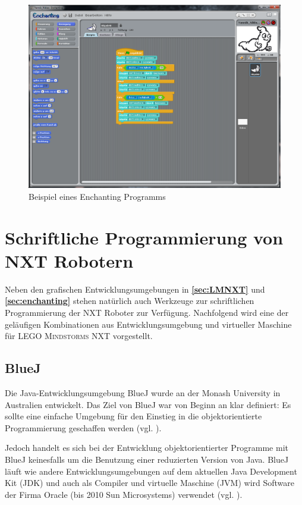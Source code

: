 \documentclass[paper=a4, DIV=calc, BCOR=12mm, twoside=on, onecolumn=on, open = right, titlepage =on, parskip =half-, headsepline = on, footsepline = off, chapterprefix = off, appendixprefix = on, fontsize = 12pt, numbers = noenddot, abstract = on]{scrbook}
\begin{document}
\begin{figure}[htb]
\centering
\includegraphics[width=\textwidth]{images/Beispielprogramm_Enchanting.png} 
\caption{Beispiel eines Enchanting Programms}
\label{fig:Bsp Enchanting}
\end{figure}



\section{Schriftliche Programmierung von NXT Robotern}
\label{sec:bluejetc}
Neben den grafischen Entwicklungsumgebungen in \textbf{\ref{sec:LMNXT}} und \textbf{\ref{sec:enchanting}} stehen natürlich auch Werkzeuge zur schriftlichen Programmierung der NXT Roboter zur Verfügung. Nachfolgend wird eine der geläufigen Kombinationen aus Entwicklungsumgebung und virtueller Maschine für \textsc{LEGO Mindstorms} NXT vorgestellt. 
\vfill

\subsection{BlueJ}
\label{sec:bluej}
Die Java-Entwicklungsumgebung BlueJ wurde an der Monash University in Australien entwickelt. Das Ziel von BlueJ war von Beginn an klar definiert: Es sollte eine einfache Umgebung für den Einstieg in die objektorientierte Programmierung geschaffen werden (vgl. \cite[S.14]{barnes:03}).

Jedoch handelt es sich bei der Entwicklung objektorientierter Programme mit BlueJ keinesfalls um die Benutzung einer reduzierten Version von Java. BlueJ läuft wie andere Entwicklungsumgebungen auf dem aktuellen Java Development Kit (JDK) und auch als Compiler und virtuelle Maschine (JVM) wird Software der Firma Oracle (bis 2010 Sun Microsystems) verwendet (vgl. \cite[S.15]{barnes:03}).
\end{document}
